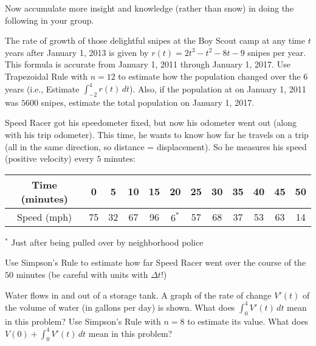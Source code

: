 \documentclass[handout]{ximera}
\begin{document}
Now accumulate more insight and knowledge (rather than snow) in doing the following in your group.
\begin{exercise}
The rate of growth of those delightful snipes at the Boy Scout camp at any time $t$ years after January 1, 2013 is given by $r(t) = 2t^3-t^2-8t-9$ snipes per year.  This formula is accurate from January 1, 2011 through January 1, 2017.  Use Trapezoidal Rule with $n = 12$ to estimate how the population changed over the $6$ years (i.e., Estimate $\int_{-2}^4 r(t)\, dt$).  Also, if the population at on January 1, 2011 was $5600$ snipes, estimate the total population on January 1, 2017.  

\end{exercise}


\begin{exercise}
Speed Racer got his speedometer fixed, but now his odometer went out (along with his trip odometer).  This time, he wants to know how far he travels on a trip (all in the same direction, so distance = displacement).  So he measures his speed (positive velocity) every $5$ minutes:
\begin{center}
    \begin{tabular}{|c|c|c|c|c|c|c|c|c|c|c|c|} \hline
        Time (minutes) & 0&5&10&15&20&25&30&35&40&45&50  \\ \hline
        Speed (mph) & 75&32&67&96&$6^\ast$&57&68&37&53& 63&14 \\ \hline
    \end{tabular}
\end{center}
$^\ast$ Just after being pulled over by neighborhood police

Use Simpson's Rule to estimate how far Speed Racer went over the course of the $50$ minutes (be careful with units with $\Delta t$!)
\end{exercise}

\begin{exercise}
Water flows in and out of a storage tank.  A graph of the rate of change $V'(t)$ of the volume of water (in gallons per day) is shown.  What does $\int_0^4 V'(t)\, dt$ mean in this problem?  Use Simpson’s Rule with $n = 8$ to estimate its value.  What does $V(0) + \int_0^4 V'(t)\, dt$ mean in this problem?

\begin{center}
\end{center}


\end{exercise}
\end{document}

